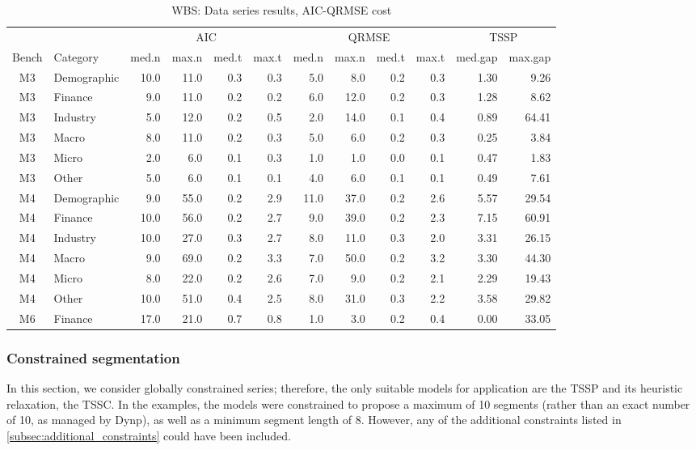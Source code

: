\documentclass[preprints,article,submit,pdftex,moreauthors]{Definitions/mdpi}
\begin{document}
\begin{table}[ht]
	\centering
	\caption{WBS: Data series results, AIC-QRMSE cost}\label{tab:WBSeriesAICQRMSE}%
\begin{tabular}{@{}cl|rr|rr|rr|rr|rr}
	\toprule
	& & \multicolumn{4}{c|}{AIC} & \multicolumn{4}{c}{QRMSE} & \multicolumn{2}{|c}{TSSP} \\
	Bench & Category & med.n & max.n & med.t & max.t & med.n & max.n & med.t & max.t & med.gap & max.gap \\
	\midrule
	M3 & Demographic  & 10.0 & 11.0 & 0.3 & 0.3 & 5.0 & 8.0 & 0.2 & 0.3 & 1.30 &  9.26\\
	M3 & Finance      & 9.0 & 11.0 & 0.2 & 0.2 & 6.0 & 12.0 & 0.2 & 0.3 & 1.28 &  8.62\\
	M3 & Industry     & 5.0 & 12.0 & 0.2 & 0.5 & 2.0 & 14.0 & 0.1 & 0.4 & 0.89 & 64.41 \\
	M3 & Macro        & 8.0 & 11.0 & 0.2 & 0.3 & 5.0 & 6.0 & 0.2 & 0.3 & 0.25 &  3.84\\
	M3 & Micro        & 2.0 & 6.0 & 0.1 & 0.3 & 1.0 & 1.0 & 0.0 & 0.1& 0.47 &  1.83 \\
	M3 & Other        & 5.0 & 6.0 & 0.1 & 0.1 & 4.0 & 6.0 & 0.1 & 0.1 & 0.49 &  7.61\\
	M4 & Demographic & 9.0 & 55.0 & 0.2 & 2.9 & 11.0 & 37.0 & 0.2 & 2.6 & 5.57 & 29.54\\
	M4 & Finance & 10.0 & 56.0 & 0.2 & 2.7 & 9.0 & 39.0 & 0.2 & 2.3 & 7.15 & 60.91\\
	M4 & Industry & 10.0 & 27.0 & 0.3 & 2.7 & 8.0 & 11.0 & 0.3 & 2.0 & 3.31 & 26.15\\
	M4 & Macro & 9.0 & 69.0 & 0.2 & 3.3 & 7.0 & 50.0 & 0.2 & 3.2 & 3.30 & 44.30 \\
	M4 & Micro & 8.0 & 22.0 & 0.2 & 2.6 & 7.0 & 9.0 & 0.2 & 2.1 & 2.29 & 19.43\\
	M4 & Other & 10.0 & 51.0 & 0.4 & 2.5 & 8.0 & 31.0 & 0.3 & 2.2 & 3.58 & 29.82\\
	M6 & Finance & 17.0 & 21.0 & 0.7 & 0.8 & 1.0 & 3.0 & 0.2 & 0.4 & 0.00 & 33.05\\
	\bottomrule
\end{tabular}
\end{table}

\subsubsection{Constrained segmentation}

In this section, we consider globally constrained series; therefore, the only suitable models for application are the TSSP and its heuristic relaxation, the TSSC. In the examples, the models were constrained to propose a maximum of 10 segments (rather than an exact number of 10, as managed by Dynp), as well as a minimum segment length of 8. However, any of the additional constraints listed in \ref{subsec:additional_constraints} could have been included.
\end{document}
